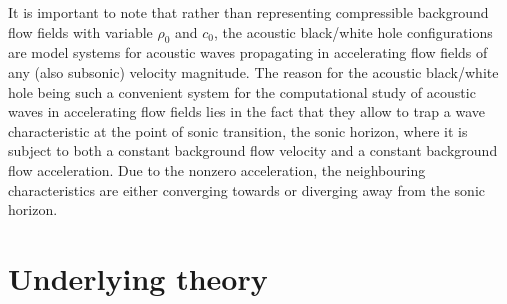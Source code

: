 It is important to note that rather than representing compressible background flow fields with variable $\rho_0$ and $c_0$, the acoustic black/white hole configurations are model systems for acoustic waves propagating in accelerating flow fields of any (also subsonic) velocity magnitude. The reason for the acoustic black/white hole being such a convenient system for the computational study of acoustic waves in accelerating flow fields lies in the fact that they allow to trap a wave characteristic at the point of sonic transition, the sonic horizon, where it is subject to both a constant background flow velocity and a constant background flow acceleration. Due to the nonzero acceleration, the neighbouring characteristics are either converging towards or diverging away from the sonic horizon.





\section{Underlying theory}
\label{sec:Underlying theory}

